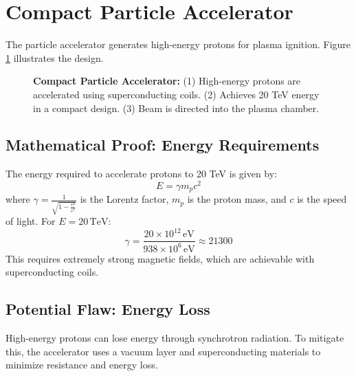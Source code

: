 \documentclass[12pt, a4paper]{article}
\begin{document}
\section{Compact Particle Accelerator}
The particle accelerator generates high-energy protons for plasma ignition. Figure \ref{fig:compact_accelerator} illustrates the design.

\begin{figure}[H]
\centering
{}
\caption{
\textbf{Compact Particle Accelerator:} 
(1) High-energy protons are accelerated using superconducting coils. 
(2) Achieves 20 TeV energy in a compact design. 
(3) Beam is directed into the plasma chamber.
}
\label{fig:compact_accelerator}
\end{figure}

\subsection{Mathematical Proof: Energy Requirements}
The energy required to accelerate protons to 20 TeV is given by:
\[
E = \gamma m_p c^2
\]
where \( \gamma = \frac{1}{\sqrt{1 - \frac{v^2}{c^2}}} \) is the Lorentz factor, \( m_p \) is the proton mass, and \( c \) is the speed of light. For \( E = 20 \, \text{TeV} \):
\[
\gamma = \frac{20 \times 10^{12} \, \text{eV}}{938 \times 10^6 \, \text{eV}} \approx 21300
\]
This requires extremely strong magnetic fields, which are achievable with superconducting coils.

\subsection{Potential Flaw: Energy Loss}
High-energy protons can lose energy through synchrotron radiation. To mitigate this, the accelerator uses a vacuum layer and superconducting materials to minimize resistance and energy loss.
\end{document}
